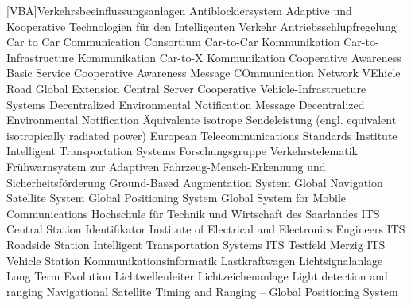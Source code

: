 
[VBA]{Verkehrsbeeinflussungsanlagen}
 {Antiblockiersystem}
 {Adaptive und Kooperative Technologien für den Intelligenten Verkehr}
 {Antriebsschlupfregelung}
 {Car to Car Communication Consortium}
 {Car-to-Car Kommunikation}
 {Car-to-Infra\-structure Kommunikation}
 {Car-to-X Kommunikation}
 {Cooperative Awareness Basic Service}
 {Cooperative Awareness Message}
 {COmmunication Network VEhicle Road Global Extension}
 {Central Server}
 {Cooperative Vehicle-Infrastructure Systems}
 {Decentralized Environmental Notification Message}
 {Decentralized Environmental Notification}
 {Äquivalente isotrope Sendeleistung (engl. equivalent isotropically radiated power)}
 {European Telecommunications Standards Institute Intelligent Transportation Systems}
 {Forschungsgruppe Verkehrstelematik}
 {Frühwarnsystem zur Adaptiven Fahrzeug-Mensch-Erkennung und Sicherheitsförderung}
 {Ground-Based Augmentation System}
 {Global Navigation Satellite System}
 {Global Positioning System}
 {Global System for Mobile Communications}
 {Hochschule für Technik und Wirtschaft des Saarlandes}
 {ITS Central Station}
 {Identifikator}
 {Institute of Electrical and Electronics Engineers}
 {\ac{ITS} Roadside Station}
 {Intelligent Transportation Systems}
 {ITS Testfeld Merzig}
 {ITS Vehicle Station}
 {Kommunikationsinformatik}
 {Lastkraftwagen}
 {Lichtsignalanlage}
 {Long Term Evolution}
 {Lichtwellenleiter}
 {Lichtzeichenanlage}
 {Light detection and ranging}
 {Navigational Satellite Timing and Ranging – Global Positioning System}
